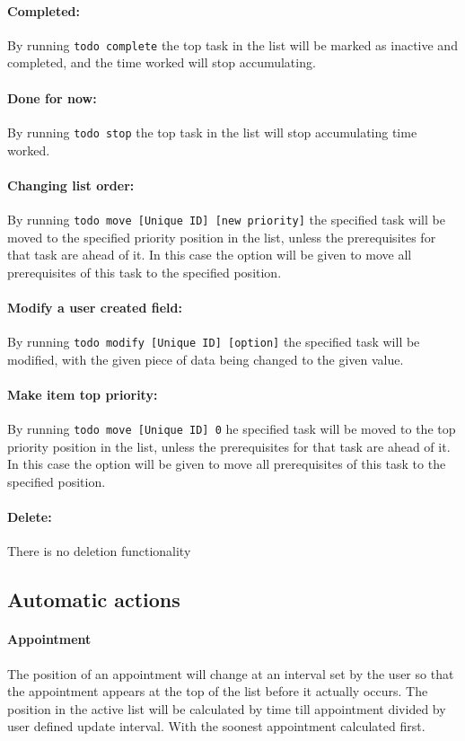 \documentclass[12pt]{article}
\newcommand{\e}[1] {{\tt #1}}
\begin{document}
\paragraph{Completed:} \label{sec:Completed} By running \e{todo complete} the top task in the list will be marked as inactive and completed, and the time worked will stop accumulating.
\paragraph{Done for now:} \label{sec:Done for now} By running \e{todo stop} the top task in the list will stop accumulating time worked.
\paragraph{Changing list order:} \label{sec:Change order} By running \e{todo move [Unique ID] [new priority]} the specified task will be moved to the specified priority position in the list, unless the prerequisites for that task are ahead of it. In this case the option will be given to move all prerequisites of this task to the specified position.
\paragraph{Modify a user created field:} \label{sec:Modify} By running \e{todo modify [Unique ID] [option]} the specified task will be modified, with the given piece of data being changed to the given value.
\paragraph{Make item top priority:} \label{sec:Make top} By running \e{todo move [Unique ID] 0} he specified task will be moved to the top priority position in the list, unless the prerequisites for that task are ahead of it. In this case the option will be given to move all prerequisites of this task to the specified position.

\paragraph{Delete:} \label{sec:Delete} There is no deletion functionality
\subsection{Automatic actions}
\setcounter{paragraph}{0}
\setcounter{subsubsection}{0}
\paragraph{Appointment} \label{sec:Auto appointments} The position of an appointment will change at an interval set by the user so that the appointment appears at the top of the list before it actually occurs. The position in the active list will be calculated by time till appointment divided by user defined update interval. With the soonest appointment calculated first.
\end{document}

